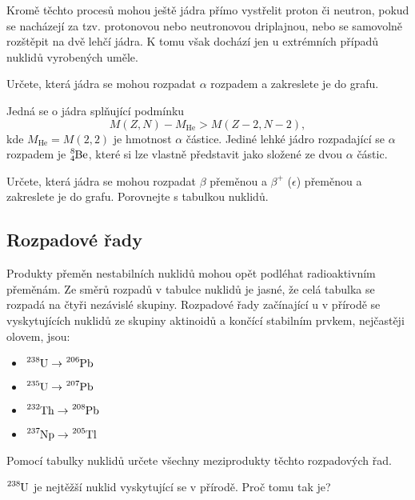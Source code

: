 \documentclass[a4paper,12pt,oneside]{article}
\theoremstyle{red}
\begin{document}
    Kromě těchto procesů mohou ještě jádra přímo vystřelit proton či neutron, pokud se nacházejí za tzv. protonovou nebo neutronovou driplajnou, nebo se samovolně rozštěpit na dvě lehčí jádra.
    K tomu však dochází jen u extrémních případů nuklidů vyrobených uměle.

    \begin{task}
        Určete, která jádra se mohou rozpadat $\alpha$ rozpadem a zakreslete je do grafu.
    \end{task}
    Jedná se o jádra splňující podmínku
    \begin{equation}
        M(Z, N)-M_{\mathrm{He}}>M(Z-2,N-2),
    \end{equation}
    kde $M_{\mathrm{He}}=M(2,2)$ je hmotnost $\alpha$ částice.
    Jediné lehké jádro rozpadající se $\alpha$ rozpadem je $\ce{^{8}_{4}Be}$, které si lze vlastně představit jako složené ze dvou $\alpha$ částic.

    \begin{task}
        Určete, která jádra se mohou rozpadat $\beta$ přeměnou a $\beta^{+}$ ($\epsilon$) přeměnou a zakreslete je do grafu.
        Porovnejte s tabulkou nuklidů.
    \end{task}
    
\subsection{Rozpadové řady}
    Produkty přeměn nestabilních nuklidů mohou opět podléhat radioaktivním přeměnám.
    Ze směrů rozpadů v tabulce nuklidů je jasné, že celá tabulka se rozpadá na čtyři nezávislé skupiny.
    Rozpadové řady začínající u v přírodě se vyskytujících nuklidů ze skupiny aktinoidů a končící stabilním prvkem, nejčastěji olovem, jsou:
    \begin{itemize}
        \item $\ce{^{238}U}\rightarrow\ce{^{206}Pb}$
        \item $\ce{^{235}U}\rightarrow\ce{^{207}Pb}$
        \item $\ce{^{232}Th}\rightarrow\ce{^{208}Pb}$
        \item $\ce{^{237}Np}\rightarrow\ce{^{205}Tl}$
    \end{itemize}
    \begin{task}
        Pomocí tabulky nuklidů určete všechny meziprodukty těchto rozpadových řad.
    \end{task}

    \begin{task}
        $\ce{^{238}U}$ je nejtěžší nuklid vyskytující se v přírodě.
        Proč tomu tak je?
    \end{task}
\end{document}
